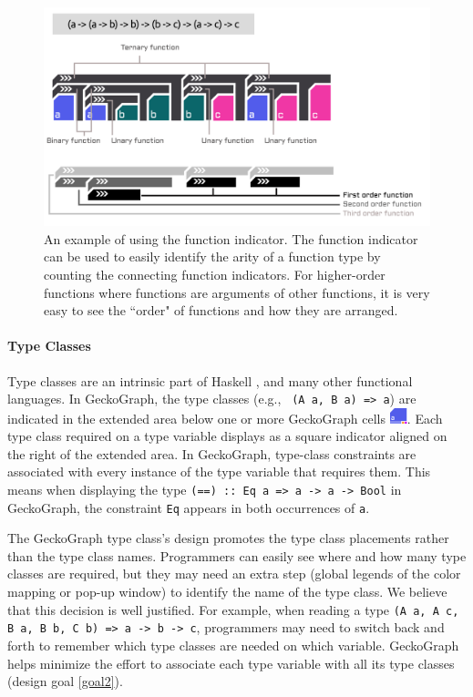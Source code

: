 \begin{figure}[hbt]
  \includegraphics[width=\linewidth]{figures/Indicator}
  \caption[An example of using the function indicator in GeckoGraph]{
        \label{fig:indicator}
        An example of using the function indicator. The function indicator can be used to easily identify the arity of a function type by counting the connecting function indicators. For higher-order functions where functions are arguments of other functions, it is very easy to see the ``order" of functions and how they are arranged. 
  }
\end{figure}


 
\paragraph{Type Classes} 
Type classes are an intrinsic part of Haskell \cite{Hudak2007-kn}, and many other functional languages. In GeckoGraph, the type classes (e.g., \texttt{ (A a, B a) => a}) are indicated in the extended area below one or more GeckoGraph cells \includegraphics[height=1.2em]{figures/TypeClass.png}. Each type class required on a type variable displays as a square indicator aligned on the right of the extended area. In GeckoGraph, type-class constraints are associated with every instance of the type variable that requires them. This means when displaying the type \texttt{(==) :: Eq a => a -> a -> Bool} in GeckoGraph, the constraint \texttt{Eq} appears in both occurrences of \texttt{a}. 

The GeckoGraph type class's design promotes the type class placements rather than the type class names. Programmers can easily see where and how many type classes are required, but they may need an extra step (global legends of the color mapping or pop-up window) to identify the name of the type class. We believe that this decision is well justified. For example, when reading a type \texttt{(A a, A c, B a, B b, C b) => a -> b -> c}, programmers may need to switch back and forth to remember which type classes are needed on which variable. GeckoGraph helps minimize the effort to associate each type variable with all its type classes (design goal \ref{goal2}). 



